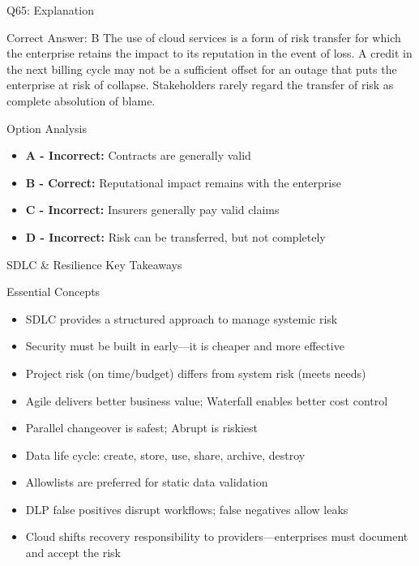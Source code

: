 \documentclass{beamer}
\begin{document}
	\begin{frame}{Q65: Explanation}
		\begin{block}{Correct Answer: B}
			The use of cloud services is a form of risk transfer for which the enterprise retains the impact to its reputation in the event of loss. A credit in the next billing cycle may not be a sufficient offset for an outage that puts the enterprise at risk of collapse. Stakeholders rarely regard the transfer of risk as complete absolution of blame.
		\end{block}
		\begin{block}{Option Analysis}
			\begin{itemize}
				\item \textbf{A - Incorrect:} Contracts are generally valid
				\item \textbf{B - Correct:} Reputational impact remains with the enterprise
				\item \textbf{C - Incorrect:} Insurers generally pay valid claims
				\item \textbf{D - Incorrect:} Risk can be transferred, but not completely
			\end{itemize}
		\end{block}
	\end{frame}
	
	
	\begin{frame}{SDLC \& Resilience Key Takeaways}
		\begin{block}{Essential Concepts}
			\begin{itemize}
				\item SDLC provides a structured approach to manage systemic risk
				\item Security must be built in early—it is cheaper and more effective
				\item Project risk (on time/budget) differs from system risk (meets needs)
				\item Agile delivers better business value; Waterfall enables better cost control
				\item Parallel changeover is safest; Abrupt is riskiest
				\item Data life cycle: create, store, use, share, archive, destroy
				\item Allowlists are preferred for static data validation
				\item DLP false positives disrupt workflows; false negatives allow leaks
				\item Cloud shifts recovery responsibility to providers—enterprises must document and accept the risk
			\end{itemize}
		\end{block}
	\end{frame}
	
\end{document}
